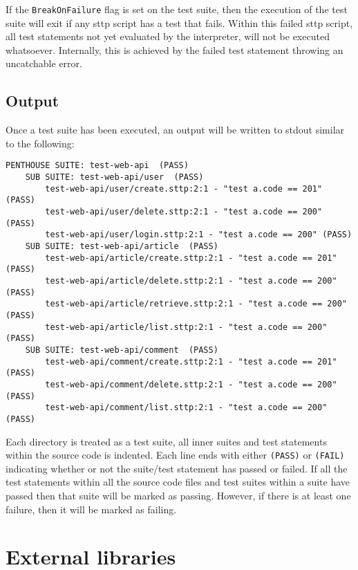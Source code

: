 If the \verb|BreakOnFailure| flag is set on the test suite, then the execution of the test suite will exit if any sttp script has a test that fails. Within this failed sttp script, all test statements not yet evaluated by the interpreter, will not be executed whatsoever. Internally, this is achieved by the failed test statement throwing an uncatchable error.

\subsection{Output}

Once a test suite has been executed, an output will be written to stdout similar to the following:

\begin{verbatim}
PENTHOUSE SUITE: test-web-api  (PASS)
    SUB SUITE: test-web-api/user  (PASS)
        test-web-api/user/create.sttp:2:1 - "test a.code == 201" (PASS)
        test-web-api/user/delete.sttp:2:1 - "test a.code == 200" (PASS)
        test-web-api/user/login.sttp:2:1 - "test a.code == 200" (PASS)
    SUB SUITE: test-web-api/article  (PASS)
        test-web-api/article/create.sttp:2:1 - "test a.code == 201" (PASS)
        test-web-api/article/delete.sttp:2:1 - "test a.code == 200" (PASS)
        test-web-api/article/retrieve.sttp:2:1 - "test a.code == 200" (PASS)
        test-web-api/article/list.sttp:2:1 - "test a.code == 200" (PASS)
    SUB SUITE: test-web-api/comment  (PASS)
        test-web-api/comment/create.sttp:2:1 - "test a.code == 201" (PASS)
        test-web-api/comment/delete.sttp:2:1 - "test a.code == 200" (PASS)
        test-web-api/comment/list.sttp:2:1 - "test a.code == 200" (PASS)
\end{verbatim}

Each directory is treated as a test suite, all inner suites and test statements within the source code is indented. Each line ends with either \verb|(PASS)| or \verb|(FAIL)| indicating whether or not the suite/test statement has passed or failed. If all the test statements within all the source code files and test suites within a suite have passed then that suite will be marked as passing. However, if there is at least one failure, then it will be marked as failing.

\section{External libraries}

